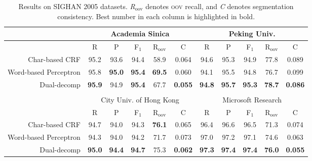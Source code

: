 \begin{table*}
\centering
\begin{small}
\begin{tabular}{ r | c | c | c | c | c | c | c | c | c | c  }
\multicolumn{1}{c|}{} & \multicolumn{5}{c|}{Academia Sinica} &  \multicolumn{5}{c}{Peking Univ.} \\
\hline
\multicolumn{1}{c|}{}   & \multicolumn{1}{c}{R} &  \multicolumn{1}{c}{P}     &  \multicolumn{1}{c}{F$_1$}   &    \multicolumn{1}{c}{R$_{\mathrm{oov}}$}   &   \multicolumn{1}{c|}{C}  & \multicolumn{1}{c}{R}  &  \multicolumn{1}{c}{P}   &  \multicolumn{1}{c}{F$_1$}   &   \multicolumn{1}{c}{R$_{\mathrm{oov}}$}  &   \multicolumn{1}{c}{C} \\ 
Char-based CRF    &  95.2 &   93.6  & 94.4  &  58.9 & 0.064                                               &  94.6             &    95.3 & 94.9  &   77.8   & 0.089    \\
Word-based Perceptron &  95.8 & \textbf{95.0} & \textbf{95.4}  & \textbf{69.5} & 0.060  &  94.1             & 95.5  & 94.8  &  76.7 & 0.099     \\ 
Dual-decomp      & \textbf{95.9} & 94.9   & \textbf{95.4}  & {67.7} & \textbf{0.055}            & \textbf{94.8} & \textbf{95.7} & \textbf{95.3}  &  \textbf{78.7} & \textbf{0.086}   \\
\multicolumn{1}{c|}{} &  \multicolumn{5}{c|}{} &  \multicolumn{5}{c}{} \\
\multicolumn{1}{c|}{} &  \multicolumn{5}{c|}{City Univ. of Hong Kong} &  \multicolumn{5}{c}{Microsoft Research}  \\
\hline
\multicolumn{1}{c|}{}   & \multicolumn{1}{c}{R} &  \multicolumn{1}{c}{P}     &  \multicolumn{1}{c}{F$_1$}   &    \multicolumn{1}{c}{R$_{\mathrm{oov}}$}   &   \multicolumn{1}{c|}{C}  & \multicolumn{1}{c}{R}  &  \multicolumn{1}{c}{P}   &  \multicolumn{1}{c}{F$_1$}   &   \multicolumn{1}{c}{R$_{\mathrm{oov}}$}  &   \multicolumn{1}{c}{C} \\ 
Char-based CRF                 & 94.7 & 94.0 & 94.3  & \textbf{76.1}                            & 0.065             & 96.4 &              96.6 &             96.5  & 71.3 & 0.074 \\
Word-based Perceptron    & 94.3 & 94.0 & 94.2  & 71.7                                         & 0.073              &  97.0 &              97.2                & 97.1  & 74.6 & 0.063  \\
Dual-decomp                   & \textbf{95.0} & \textbf{94.4}  & \textbf{94.7}  & {75.3} & \textbf{0.062} & \textbf{97.3} &  \textbf{97.4} &  \textbf{97.4}  & \textbf{76.0} & \textbf{0.055}  \\
\end{tabular} 
\caption{Results on SIGHAN 2005 datasets. \textit{R$_{\mathrm{oov}}$}  denotes \textsc{oov} recall, and \textit{C} denotes segmentation consistency. Best number in each column is highlighted in bold.
}\label{tbl:results}
\end{small}
\end{table*}

